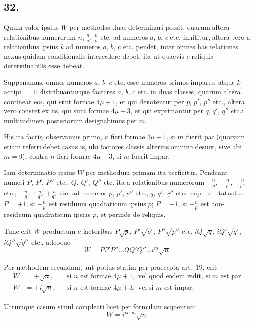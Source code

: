 \documentclass[12pt,a4paper]{article}
\theoremstyle{plain}
\theoremstyle{definition}
\theoremstyle{remark}
\begin{document}
\subsection*{32.}
Quum valor ipsius $W$ per methodos duas determinari possit, quarum altera relationibus numerorum $n$, $\frac{n}{a}$, $\frac{n}{b}$ etc. ad numeros $a$, $b$, $c$ etc. innititur, altera vero a relationibus ipsius $k$ ad numeros $a$, $b$, $c$ etc. pendet, inter omnes has relationes nexus quidam conditionalis intercedere debet, ita ut quaevis e reliquis determinabilis esse debeat.

Supponamus, omnes numeros $a$, $b$, $c$ etc. esse numeros primos impares, atque $k$ accipi $=1$; distribuanturque factores $a$, $b$, $c$ etc. in duas classes, quarum altera contineat eos, qui sunt formae $4\mu+1$, et qui denotentur per $p$, $p'$, $p''$ etc., altera vero constet ex iis, qui sunt formae $4\mu+3$, et qui exprimantur per $q$, $q'$, $q''$ etc.: multitudinem posteriorum designabimus per $m$.

His ita factis, observamus primo, $n$ fieri formae $4\mu+1$, si $m$ fuerit par (quorsum etiam referri debet casus is, ubi factores classis alterius omnino desunt, sive ubi $m=0$), contra $n$ fieri formae $4\mu+3$, si $m$ fuerit impar.

Iam determinatio ipsius $W$ per methodum primam ita perficitur. Pendeant numeri $P$, $P'$, $P''$ etc., $Q$, $Q'$, $Q''$ etc. ita a relationibus numerorum $-\frac{n}{p}$, $-\frac{n}{p'}$, $-\frac{n}{p''}$ etc., $+\frac{n}{q}$, $+\frac{n}{q'}$, $+\frac{n}{q''}$ etc. ad numeros $p$, $p'$, $p''$ etc., $q$, $q'$, $q''$ etc. resp., ut statuatur $P=+1$, si $-\frac{n}{p}$ est residuum quadraticum ipsius $p$; $P=-1$, si $-\frac{n}{p}$ est non-residuum quadraticum ipsius $p$, et perinde de reliquis.

Tunc erit $W$ productum e factoribus $P\sqrt{p}$, $P'\sqrt{p'}$, $P''\sqrt{p''}$ etc. $iQ\sqrt{q}$, $iQ'\sqrt{q'}$, $iQ''\sqrt{q''}$ etc., adeoque
\[W = PP'P''\ldots QQ'Q''\ldots i^m \sqrt{n}\]

Per methodum secundam, aut potius statim per praecepta art.~19, erit
\begin{align*}
W &= +\sqrt{n}, &&\text{si }n\text{ est formae }4\mu+1,\text{ vel quod eodem redit, si }m\text{ est par}\\
W &= +i\sqrt{n}, &&\text{si }n\text{ est formae }4\mu+3,\text{ vel si }m\text{ est impar}.
\end{align*}

Utrumque casum simul complecti licet per formulam sequentem:
\[W = i^{m \cdot m}\sqrt{n}\]
\end{document}
